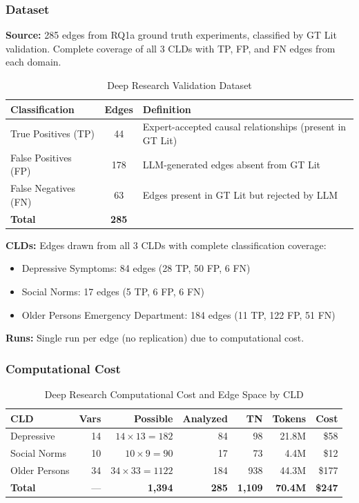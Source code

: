 \subsubsection{Dataset}

\textbf{Source:} 285 edges from RQ1a ground truth experiments, classified by GT Lit validation. Complete coverage of all 3 CLDs with TP, FP, and FN edges from each domain.

\begin{table}[H]
\centering
\caption{Deep Research Validation Dataset}
\label{tab:dr_dataset}
\footnotesize
\begin{tabular}{@{}l c l@{}}
\toprule
\textbf{Classification} & \textbf{Edges} & \textbf{Definition} \\
\midrule
True Positives (TP) & 44 & Expert-accepted causal relationships (present in GT Lit) \\
False Positives (FP) & 178 & LLM-generated edges absent from GT Lit \\
False Negatives (FN) & 63 & Edges present in GT Lit but rejected by LLM \\
\midrule
\textbf{Total} & \textbf{285} & \\
\bottomrule
\end{tabular}
\end{table}

\textbf{CLDs:} Edges drawn from all 3 CLDs with complete classification coverage:
\begin{itemize}[noitemsep]
    \item Depressive Symptoms: 84 edges (28 TP, 50 FP, 6 FN)
    \item Social Norms: 17 edges (5 TP, 6 FP, 6 FN)
    \item Older Persons Emergency Department: 184 edges (11 TP, 122 FP, 51 FN)
\end{itemize}

\textbf{Runs:} Single run per edge (no replication) due to computational cost.

\subsubsection{Computational Cost}

\begin{table}[H]
\centering
\caption{Deep Research Computational Cost and Edge Space by CLD}
\label{tab:dr_cost}
\footnotesize
\begin{tabular}{@{}l r r r r r r@{}}
\toprule
\textbf{CLD} & \textbf{Vars} & \textbf{Possible} & \textbf{Analyzed} & \textbf{TN} & \textbf{Tokens} & \textbf{Cost} \\
\midrule
Depressive & 14 & $14 \times 13 = 182$ & 84 & 98 & 21.8M & \$58 \\
Social Norms & 10 & $10 \times 9 = 90$ & 17 & 73 & 4.4M & \$12 \\
Older Persons & 34 & $34 \times 33 = 1122$ & 184 & 938 & 44.3M & \$177 \\
\midrule
\textbf{Total} & --- & \textbf{1,394} & \textbf{285} & \textbf{1,109} & \textbf{70.4M} & \textbf{\$247} \\
\bottomrule
\end{tabular}
\end{table}

